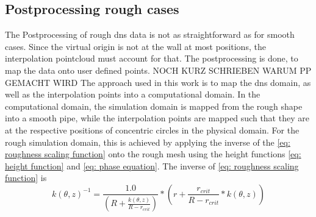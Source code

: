\subsection{Postprocessing rough cases}\label{subsec: Postprocessing rough cases}
The Postprocessing of rough \acrshort{dns} data is not as straightforward as for smooth cases.
Since the virtual origin is not at the wall at most positions, the interpolation pointcloud  must account for that.
The postprocessing is done, to map the data onto user defined points.
NOCH KURZ SCHRIEBEN WARUM PP GEMACHT WIRD
The approach used in this work is to map the \acrshort{dns} domain, as well as the interpolation points into a computational domain.
In the computational domain, the simulation domain is mapped from the rough shape into a smooth pipe, while the interpolation points are mapped such that they are at the respective positions of concentric circles in the physical domain.
For the rough simulation domain, this is achieved by applying the inverse of the \autoref{eq: roughness scaling function} onto the rough mesh using the height functions \autoref{eq: height function} and \autoref{eq: phase equation}.
The inverse of \autoref{eq: roughness scaling function} is
\begin{equation}\label{eq: inverse height function}
     k(\theta, z)^{-1} = \frac{1.0}{\left(R + \frac{k(\theta, z)}{R - r_{crit}}\right)} * \left(r + \frac{r_{crit}}{R - r_{crit}} * k(\theta, z)\right)
\end{equation}

